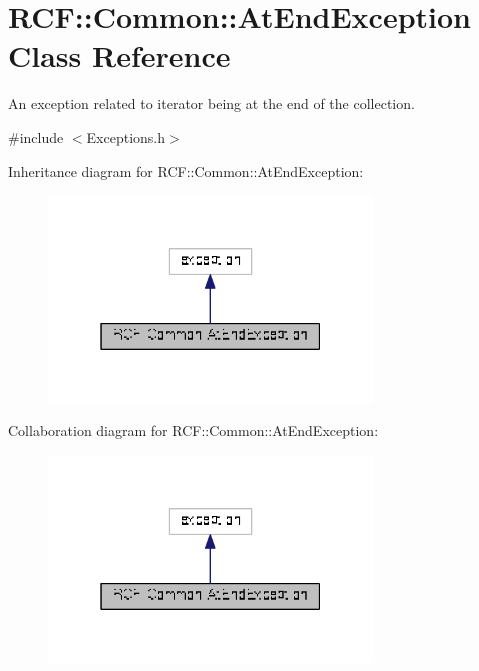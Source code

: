 \hypertarget{class_r_c_f_1_1_common_1_1_at_end_exception}{}\section{R\+C\+F\+:\+:Common\+:\+:At\+End\+Exception Class Reference}
\label{class_r_c_f_1_1_common_1_1_at_end_exception}


An exception related to iterator being at the end of the collection.  




{\ttfamily \#include $<$Exceptions.\+h$>$}



Inheritance diagram for R\+C\+F\+:\+:Common\+:\+:At\+End\+Exception\+:\nopagebreak
\begin{figure}[H]
\begin{center}
\leavevmode
\includegraphics[width=244pt]{class_r_c_f_1_1_common_1_1_at_end_exception__inherit__graph}
\end{center}
\end{figure}


Collaboration diagram for R\+C\+F\+:\+:Common\+:\+:At\+End\+Exception\+:\nopagebreak
\begin{figure}[H]
\begin{center}
\leavevmode
\includegraphics[width=244pt]{class_r_c_f_1_1_common_1_1_at_end_exception__coll__graph}
\end{center}
\end{figure}

